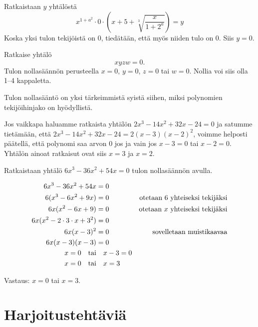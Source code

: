 
\begin{esimerkki} Ratkaistaan $y$ yhtälöstä
    \[x^{1+a^2}\cdot 0\cdot\left(x+5+\sqrt[3]{\frac{x}{1+2^a}}\right)=y\]
    Koska yksi tulon tekijöistä on $0$, tiedätään, että myös niiden tulo on $0$.
    Siis $y=0$.
\end{esimerkki}

\begin{esimerkki} Ratkaise yhtälö
    \[xyzw=0.\]
Tulon nollasäännön perusteella $x=0$, $y=0$, $z=0$ tai $w=0$. Nollia voi siis
olla 1--4 kappaletta.
\end{esimerkki}

Tulon nollasääntö on yksi tärkeimmistä syistä siihen, miksi polynomien tekijöihinjako on hyödyllistä.

Jos vaikkapa haluamme ratkaista yhtälön $2x^3-14x^2+32x-24=0$ ja satumme tietämään, että $2x^3-14x^2+32x-24=2(x-3)(x-2)^2$,
voimme helposti päätellä, että polynomi saa arvon $0$ jos ja vain jos $x-3=0$ tai $x-2=0$. Yhtälön ainoat ratkaisut ovat siis $x=3$ ja $x=2$.

\begin{esimerkki}
Ratkaistaan yhtälö $6x^3-36x^2+54x=0$ tulon nollasäännön avulla.

\begin{align*}
6x^3-36x^2+54x &= 0 \\
6(x^3-6x^2+9x) &= 0 \ \ \ \ &\text{otetaan } 6 \text{ yhteiseksi tekijäksi} \\
6x(x^2-6x+9) &= 0 &\text{otetaan } x \text{ yhteiseksi tekijäksi} \\
6x(x^2-2\cdot 3\cdot x+3^2)  &= 0 \\
6x(x-3)^2 &= 0 &\text{sovelletaan muistikaavaa} \\
6x(x-3)(x-3) &= 0 \\
x=0 \textrm{\quad tai}& \quad x-3=0 \\
x=0 \textrm{\quad tai}& \quad x=3
\end{align*}

Vastaus: $x=0$ tai $x=3$.
\end{esimerkki}

\section{Harjoitustehtäviä}

